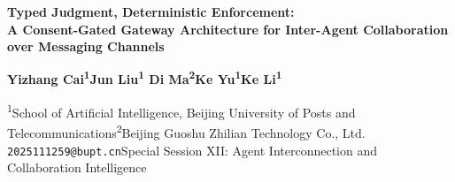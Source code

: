 \documentclass[20pt]{extarticle}
\begin{document}

\vspace*{2mm}
\begin{center}
  {\fontsize{46}{52}\selectfont\bfseries\color{teal}
   Typed Judgment, Deterministic Enforcement:\\[1mm]
   A Consent-Gated Gateway Architecture for Inter-Agent Collaboration over Messaging Channels}

  \vspace{5mm}
  {\Large\color{ink}\bfseries
   Yizhang Cai\textsuperscript{1}\quad Jun Liu\textsuperscript{1}\quad
   Di Ma\textsuperscript{2}\quad Ke Yu\textsuperscript{1}\quad Ke Li\textsuperscript{1}}

  \vspace{3mm}
  \begin{tcolorbox}[enhanced, sharp corners, colback=white, colframe=teal,
    boxrule=0.4pt, width=\textwidth, halign=center,
    borderline={0.4pt}{0pt}{teal,dashed}, fontupper=\normalsize]
    \textsuperscript{1}School of Artificial Intelligence, Beijing University of Posts and
    Telecommunications\quad\textsuperscript{2}Beijing Guoshu Zhilian Technology Co., Ltd.\\
    \texttt{2025111259@bupt.cn}\quad\textbar\quad Special Session XII: Agent Interconnection and
    Collaboration Intelligence
  \end{tcolorbox}
\end{center}

\vspace{2mm}

\end{document}
